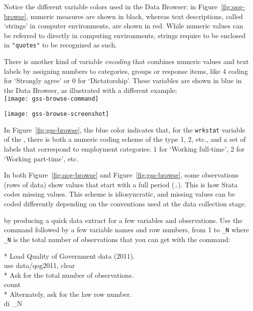 	Notice the different variable colors used in the Data Browser: in Figure~\ref{fig:qog-browse}, numeric measures are shown in black, whereas text descriptions, called `strings' in computer environments, are shown in red. While numeric values can be referred to directly in computing environments, strings require to be enclosed in \texttt{"quotes"} to be recognized as such.%
		
	There is another kind of variable \emph{encoding} that combines numeric values and text labels by assigning numbers to categories, groups or response items, like 4 coding for `Strongly agree' or 0 for `Dictatorship'. These variables are shown in blue in the Data Browser, as illustrated with a different example:\\[1em]%

		\texttt{[image: gss-browse-command]}\\[1em]%
		\begin{figure*}[h]
			\texttt{[image: gss-browse-screenshot]}%
		  \caption{The Data Editor in Browse (read-only) mode, showing \GSS data.}%
		  \label{fig:gss-browse}%
		\end{figure*}

	In Figure~\ref{fig:gss-browse}, the blue color indicates that, for the \texttt{wrkstat} variable of the \gss, there is both a numeric coding scheme of the type 1, 2, etc., and a set of labels that correspond to employment categories: 1 for `Working full-time', 2 for `Working part-time', etc.%

	In both Figure~\ref{fig:qog-browse} and Figure~\ref{fig:gss-browse}, some observations (rows of data) show values that start with a full period (\texttt{.}). This is how Stata codes missing values. This scheme is idiosyncratic, and missing values can be coded differently depending on the conventions used at the data collection stage.%

	 by producing a quick data extract for a few variables and observations. Use the  command followed by a few variable names and row numbers, from 1 to \texttt{\_N} where \texttt{\_N} is the total number of observations that you can get with the  command:%

		\begin{docspec}
			* Load Quality of Government data (2011).\\
			use data/qog2011, clear\\[1em]
	
			* Ask for the total number of observations.\\
			count\\[1em]
	
			* Alternately, ask for the law row number.\\
			di \_N
		\end{docspec}

